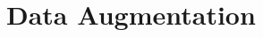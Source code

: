 \documentclass[%
	BCOR=8mm, %
	DIV=12,
	toc=bibliography, %
	toc=listof, %
	oneside, %
	egregdoesnotlikesansseriftitles, %
	]{scrbook}
\begin{document}

\section{Data Augmentation}
\label{section:dataaugmentation}
\end{document}

